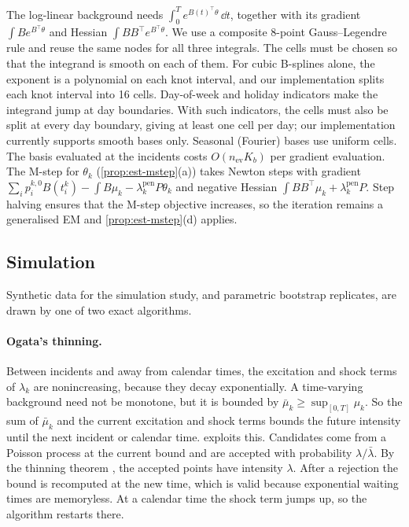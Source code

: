 The log-linear background needs $\int_0^Te^{B(t)^{\top}\theta}\,\dd t$, together with its
gradient $\int Be^{B^{\top}\theta}$ and Hessian $\int BB^{\top}e^{B^{\top}\theta}$. We
use a composite 8-point Gauss--Legendre rule and reuse the same nodes for all three
integrals. The cells must be chosen so that the integrand is smooth on each of them. For
cubic B-splines alone, the exponent is a polynomial on each knot interval, and our
implementation splits each knot interval into 16 cells. Day-of-week and holiday indicators
make the integrand jump at day boundaries. With such indicators, the cells must also be
split at every day boundary, giving at least one cell per day; our implementation
currently supports smooth bases only. Seasonal (Fourier) bases use uniform cells. The
basis evaluated at the incidents costs $O(n_{\mathrm{ev}}K_b)$ per gradient evaluation.
The M-step for $\theta_k$ (\cref{prop:est-mstep}(a)) takes Newton steps with gradient
$\sum_ip^{k,0}_iB(t^k_i)-\int B\mu_k-\lambda^{\mathrm{pen}}_kP\theta_k$ and negative
Hessian $\int BB^{\top}\mu_k+\lambda^{\mathrm{pen}}_kP$. Step halving ensures that the
M-step objective increases, so the iteration remains a generalised EM and
\cref{prop:est-mstep}(d) applies.

\subsection{Simulation}\label{app:comp-sim}

Synthetic data for the simulation study, and parametric bootstrap replicates, are drawn by
one of two exact algorithms.

\paragraph{Ogata's thinning.} Between incidents and away from calendar times, the
excitation and shock terms of $\lambda_k$ are nonincreasing, because they decay
exponentially. A time-varying background need not be monotone, but it is bounded by
$\bar\mu_k\ge\sup_{[0,T]}\mu_k$. So the sum of $\bar\mu_k$ and the current excitation and
shock terms bounds the future intensity until the next incident or calendar time.  exploits this. Candidates come from a Poisson
process at the current bound and are accepted with probability $\lambda/\bar\lambda$.
By the thinning theorem \citep{lewis1979,ogata1981}, the accepted points have intensity
$\lambda$. After a rejection the bound is recomputed at the new time, which is valid
because exponential waiting times are memoryless. At a calendar time the shock term jumps
up, so the algorithm restarts there.

